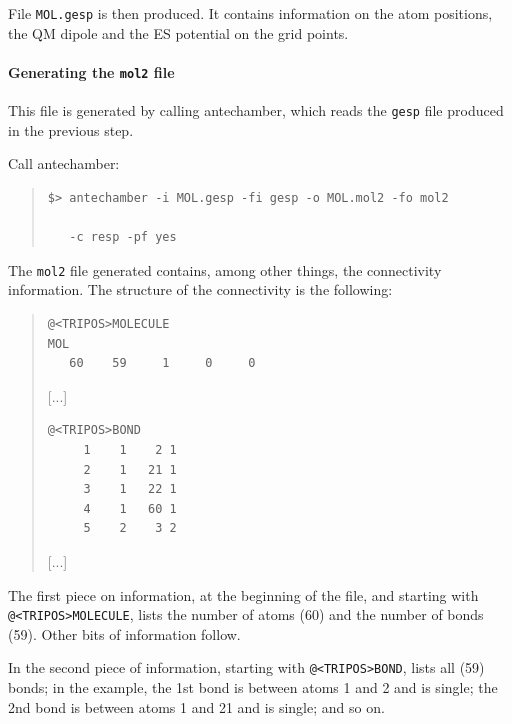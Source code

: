 \documentclass[a4paper]{report}
\begin{document}
File \texttt{MOL.gesp} is then produced. It contains information on the atom
positions, the QM dipole and the ES potential on the grid points.

\paragraph*{Generating the \texttt{mol2} file}

This file is generated by calling antechamber, which reads the \texttt{gesp} file
produced in the previous step.

Call antechamber:

\begin{framed}
\begin{quote}
\begin{verbatim}
$> antechamber -i MOL.gesp -fi gesp -o MOL.mol2 -fo mol2 

   -c resp -pf yes
\end{verbatim}
\end{quote}
\end{framed}


The \texttt{mol2} file generated contains, among other things, the connectivity
information. The structure of the connectivity is the following:

\begin{framed}
\begin{quote}
\begin{verbatim}
@<TRIPOS>MOLECULE
MOL
   60    59     1     0     0
\end{verbatim}

[...]

\begin{verbatim}
@<TRIPOS>BOND
     1    1    2 1
     2    1   21 1
     3    1   22 1
     4    1   60 1
     5    2    3 2
\end{verbatim}
[...]

\end{quote}
\end{framed}

The first piece on information, at the beginning of the file, and starting with
\texttt{@<TRIPOS>MOLECULE}, lists the number of atoms (60) and the number of bonds
(59). Other bits of information follow.

In the second piece of information, starting with \texttt{@<TRIPOS>BOND}, lists all
(59) bonds; in the example, the 1st bond is between atoms 1 and 2 and is single; the 2nd
bond is between atoms 1 and 21 and is single; and so on.
\end{document}
